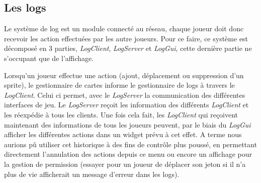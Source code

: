 \subsection{Les logs}

Le système de log est un module  connecté au réseau, chaque joueur doit donc recevoir les action effectuées par les autre joueurs.
Pour ce faire, ce système est décomposé en 3 parties,  \textit{LogClient}, \textit{LogServer} et \textit{LogGui},
cette dernière partie ne s'occupant que de l'affichage.

Lorsqu'un joueur effectue une action (ajout, déplacement ou suppression d'un sprite), le gestionnaire de cartes informe le gestionnaire de logs à travers le \textit{LogClient}.
Celui ci permet, avec le \textit{LogServer} la communication des différentes interfaces de jeu.
Le \textit{LogServer} reçoit les information des différents \textit{LogClient} et les réexpédie à tous les clients.
Une fois cela fait, les \textit{LogClient} qui reçoivent maintenant des informations de tous les joueurs peuvent, par le biais du \textit{LogGui} afficher les différentes actions dans un widget prévu à cet effet.
A terme nous aurions pû utiliser cet historique à des fins de contrôle plus poussé, en permettant directement l'annulation des actions depuis ce menu ou encore un affichage pour la gestion de permission (essayer pour un joueur de déplacer son jeton si il n'a plus de vie afficherait un message d'erreur dans les logs).